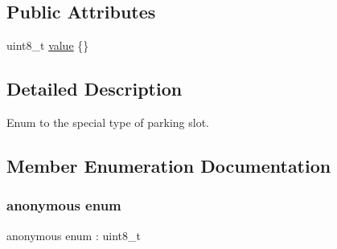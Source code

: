 \subsection*{Public Attributes}
\begin{DoxyCompactItemize}
\item 
uint8\+\_\+t \hyperlink{structmaf__perception__interface_1_1ParkingSlotSpecialTypeEnum_ae1291db7194bc46397d8694297bc9b06}{value} \{\}
\end{DoxyCompactItemize}


\subsection{Detailed Description}
Enum to the special type of parking slot. 

\subsection{Member Enumeration Documentation}
\mbox{\label{structmaf__perception__interface_1_1ParkingSlotSpecialTypeEnum_aad8aebca920fc913940ba353bb2dc8a2}} 
\subsubsection{\texorpdfstring{anonymous enum}{anonymous enum}}
{\footnotesize\ttfamily anonymous enum \+: uint8\+\_\+t}

